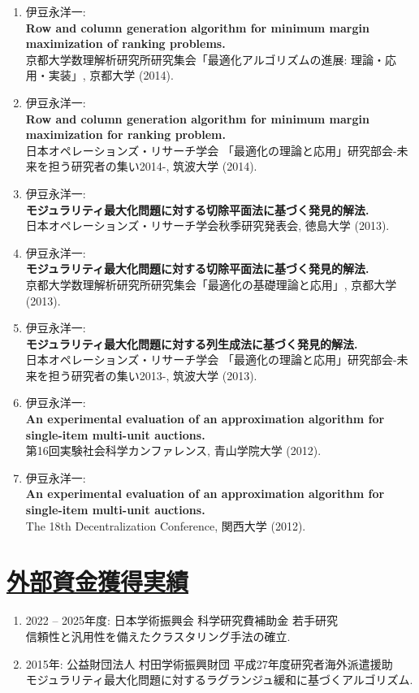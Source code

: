 \documentclass[a4j,uplatex,9pt]{jsarticle}
\begin{document}
\begin{enumerate}
\item 伊豆永洋一:\\
{\bf Row and column generation algorithm for minimum margin maximization of ranking problems.}\\
{京都大学数理解析研究所研究集会「最適化アルゴリズムの進展: 理論・応用・実装」}, 京都大学 (2014).

\item 伊豆永洋一:\\
{\bf Row and column generation algorithm for minimum margin maximization for ranking problem.}\\
{日本オペレーションズ・リサーチ学会 「最適化の理論と応用」研究部会-未来を担う研究者の集い2014-}, 筑波大学 (2014).

\item 伊豆永洋一:\\
{\bf モジュラリティ最大化問題に対する切除平面法に基づく発見的解法.}\\
{日本オペレーションズ・リサーチ学会秋季研究発表会}, 徳島大学 (2013).

\item 伊豆永洋一:\\
{\bf モジュラリティ最大化問題に対する切除平面法に基づく発見的解法.}\\
{京都大学数理解析研究所研究集会「最適化の基礎理論と応用」}, 京都大学 (2013).

\item 伊豆永洋一:\\
{\bf モジュラリティ最大化問題に対する列生成法に基づく発見的解法.}\\
{日本オペレーションズ・リサーチ学会 「最適化の理論と応用」研究部会-未来を担う研究者の集い2013-}, 筑波大学 (2013).

\item 伊豆永洋一:\\
{\bf An experimental evaluation of an approximation algorithm for single-item multi-unit auctions.}\\
{第16回実験社会科学カンファレンス}, 青山学院大学 (2012).

\item 伊豆永洋一:\\
{\bf An experimental evaluation of an approximation algorithm for single-item multi-unit auctions.}\\
{The 18th Decentralization Conference}, 関西大学 (2012).

\end{enumerate}


\section*{\underline{外部資金獲得実績}}

\begin{enumerate}
\item 2022 -- 2025年度: 日本学術振興会 科学研究費補助金 若手研究\\
{信頼性と汎用性を備えたクラスタリング手法の確立.}
\item 2015年: 公益財団法人 村田学術振興財団 平成27年度研究者海外派遣援助\\
{モジュラリティ最大化問題に対するラグランジュ緩和に基づくアルゴリズム.}
\end{enumerate}
\end{document}
